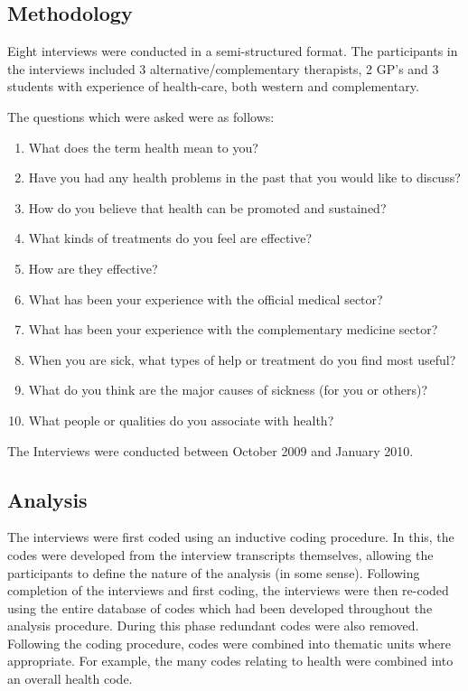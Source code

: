 \subsection{Methodology}

Eight interviews were conducted in a semi-structured format. The participants in the interviews included 3 alternative/complementary therapists, 2 GP's and 3 students with experience of health-care, both western and complementary.

The questions which were asked were as follows:
\begin{enumerate}
\item What does the term health mean to you? 
\item Have you had any health problems in the past that you would like to discuss?
\item How do you believe that health can be promoted and sustained?
\item What kinds of treatments do you feel are effective? 
\item How are they effective?
\item What has been your experience with the official medical sector?
\item What has been your experience with the complementary medicine sector?
\item When you are sick, what types of help or treatment do you find most useful?
\item What do you think are the major causes of sickness (for you or others)?
\item What people or qualities do you associate with health?
\end{enumerate}


The Interviews were conducted between October 2009 and January 2010. 

\subsection{Analysis}

The interviews were first coded using an inductive coding procedure. In this, the codes were developed from the interview transcripts themselves, allowing the participants to define the nature of the analysis (in some sense). Following completion of the interviews and first coding, the interviews were then re-coded using the entire database of codes which had been developed throughout the analysis procedure.
During this phase redundant codes were also removed. Following the coding procedure, codes were combined into thematic units where appropriate. For example, the many codes relating to health were combined into an overall health code.

